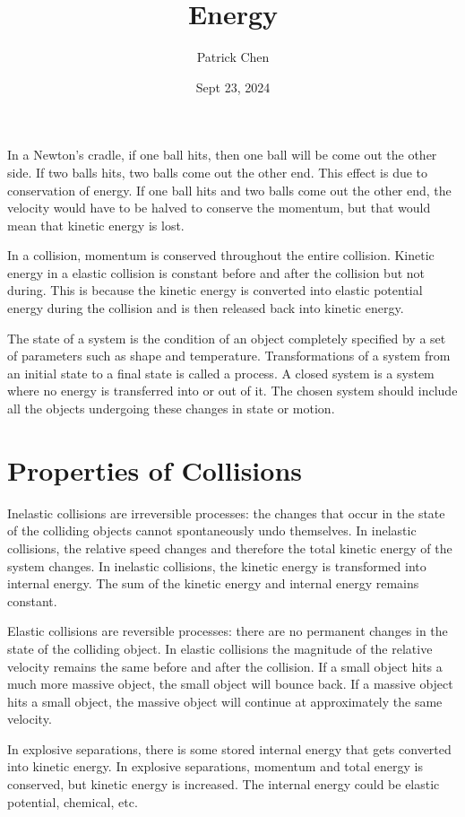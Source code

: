 \documentclass{article}
\title{Energy}
\author{Patrick Chen}
\date{Sept 23, 2024}
\theoremstyle{mytheoremstyle}
\theoremstyle{mytheoremstyle}
\theoremstyle{myproblemstyle}
\begin{document}
    \maketitle
    In a Newton's cradle, if one ball hits, then one ball will be come out the
    other side. If two balls hits, two balls come out the other end. This effect
    is due to conservation of energy. If one ball hits and two balls come out
    the other end, the velocity would have to be halved to conserve the
    momentum, but that would mean that kinetic energy is lost.

    In a collision, momentum is conserved throughout the entire collision.
    Kinetic energy in a elastic collision is constant before and after the
    collision but not during. This is because the kinetic energy is converted
    into elastic potential energy during the collision and is then released back
    into kinetic energy.

    The state of a system is the condition of an object completely specified by
    a set of parameters such as shape and temperature. Transformations of a
    system from an initial state to a final state is called a process. A closed
    system is a system where no energy is transferred into or out of it. The
    chosen system should include all the objects undergoing these changes in
    state or motion. 

    \section*{Properties of Collisions}
    Inelastic collisions are irreversible processes: the changes that occur in
    the state of the colliding objects cannot spontaneously undo themselves. In
    inelastic collisions, the relative speed changes and therefore the total
    kinetic energy of the system changes. In inelastic collisions, the kinetic
    energy is transformed into internal energy. The sum of the kinetic energy
    and internal energy remains constant. 

    Elastic collisions are reversible processes: there are no permanent changes
    in the state of the colliding object. In elastic collisions the magnitude of
    the relative velocity remains the same before and after the collision. If a
    small object hits a much more massive object, the small object will bounce
    back. If a massive object hits a small object, the massive object will
    continue at approximately the same velocity.

    In explosive separations, there is some stored internal energy that gets
    converted into kinetic energy. In explosive separations, momentum and total
    energy is conserved, but kinetic energy is increased. The internal energy
    could be elastic potential, chemical, etc.
\end{document}
